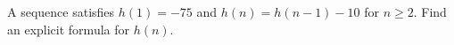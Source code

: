 A sequence satisfies $h(1)=-75$ and $h(n)=h(n-1)-10$ for $n\ge2$. Find an explicit formula for $h(n)$.
